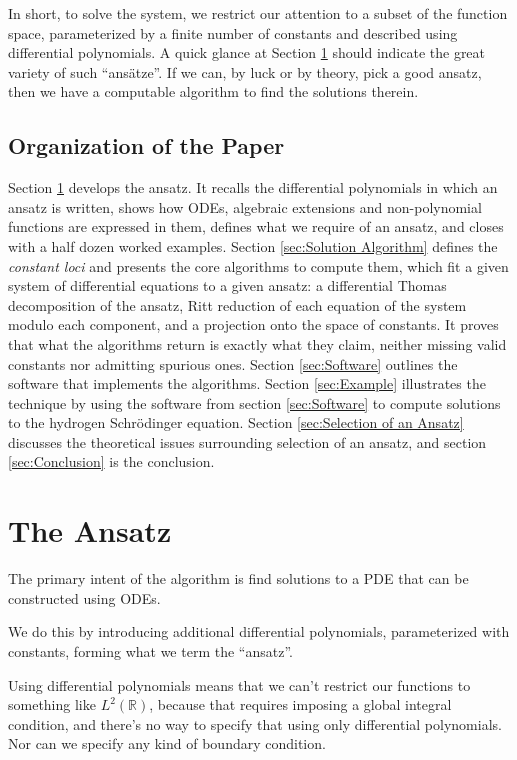 \documentclass{article}
\theoremstyle{definition}
\theoremstyle{plain}
\begin{document}
In short, to solve the system, we restrict our attention to a subset of the function
space, parameterized by a finite number of constants
and described using differential polynomials.
A quick glance at Section \ref{sec:Ansatze} should indicate the great variety of such ``ans\"atze''.
If we can, by luck or by theory, pick a good ansatz, then we have
a computable algorithm to find the solutions therein.

\subsection{Organization of the Paper}

Section \ref{sec:Ansatze} develops the ansatz.  It recalls the differential
polynomials in which an ansatz is written, shows how ODEs, algebraic extensions
and non-polynomial functions are expressed in them, defines what we require of
an ansatz, and closes with a half dozen worked examples.
Section \ref{sec:Solution Algorithm} defines the {\it constant loci} and
presents the core algorithms to compute them, which fit a
given system of differential equations to a given ansatz: a differential Thomas
decomposition of the ansatz, Ritt reduction of each equation of the system
modulo each component, and a projection onto the space
of constants.  It proves that what the algorithms return is exactly what they claim,
neither missing valid constants nor admitting spurious ones.
Section \ref{sec:Software} outlines the software that implements the algorithms.
Section \ref{sec:Example} illustrates the technique by using the software from section \ref{sec:Software}
to compute solutions to the hydrogen Schr\"odinger equation.
Section \ref{sec:Selection of an Ansatz} discusses the theoretical issues surrounding selection of an ansatz,
and section \ref{sec:Conclusion} is the conclusion.

\section{The Ansatz}
\label{sec:Ansatze}

The primary intent of the algorithm is find solutions to a PDE that can be constructed using ODEs.

We do this by introducing additional differential polynomials, parameterized with constants,
forming what we term the ``ansatz''.

Using differential polynomials means that we can't restrict our functions to
something like $L^2(\mathbb{R})$, because that requires imposing a global integral condition,
and there's no way to specify that using only differential polynomials.
Nor can we specify any kind of boundary condition.
\end{document}
